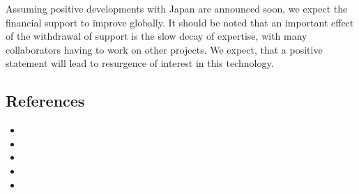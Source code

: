 Assuming positive developments with Japan are announced soon, we expect the financial support to improve globally. It should be noted that
an important effect of the withdrawal of support is the slow decay of expertise, with many collaborators having to work on other projects. We expect, that 
a positive statement will lead to resurgence of interest in this technology.

	
\subsection{References}

\begin{itemize}
\item {}
\item {}
\item {}
\item {}
\item {}
\end{itemize}
